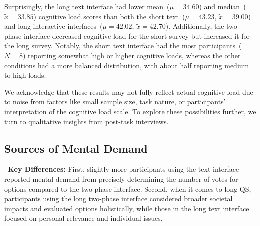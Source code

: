 
Surprisingly, the long text interface had lower mean~($\mu=34.60$) and median~($\tilde{x}=33.85$) cognitive load scores than both the short text~($\mu=43.23$, $\tilde{x}=39.00$) and long interactive interfaces~($\mu=42.02$, $\tilde{x}=42.70$). Additionally, the two-phase interface decreased cognitive load for the short survey but increased it for the long survey. Notably, the short text interface had the most participants~($N=8$) reporting somewhat high or higher cognitive loads, whereas the other conditions had a more balanced distribution, with about half reporting medium to high loads.

We acknowledge that these results may not fully reflect actual cognitive load due to noise from factors like small sample size, task nature, or participants' interpretation of the cognitive load scale. To explore these possibilities further, we turn to qualitative insights from post-task interviews.

\subsection{Sources of Mental Demand}
\label{sec:mental}

\begin{tldrbox}
   \faKey~\textbf{Key Differences:} First, slightly more participants using the text interface reported mental demand from precisely determining the number of votes for options compared to the two-phase interface. Second, when it comes to long QS, participants using the long two-phase interface considered broader societal impacts and evaluated options holistically, while those in the long text interface focused on personal relevance and individual issues. %
\end{tldrbox}

